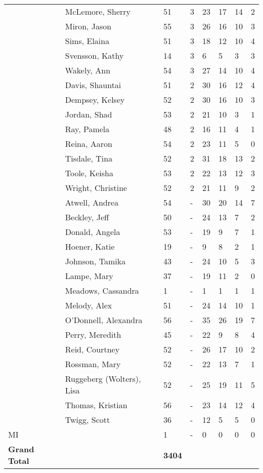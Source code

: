 \documentclass{article}\usepackage[]{graphicx}\usepackage[]{color}
\begin{document}
{\begin{longtable} { >{\raggedright}p{}p{}p{}p{}p{}p{}p{}p{}}
   \rowcolor[gray]{0.90} & McLemore, Sherry & 51 & 3 & 23 & 17 & 14 & 2 \\ 
   \rowcolor[gray]{0.90} & Miron, Jason & 55 & 3 & 26 & 16 & 10 & 3 \\ 
   & Sims, Elaina & 51 & 3 & 18 & 12 & 10 & 4 \\ 
   & Svensson, Kathy & 14 & 3 & 6 & 5 & 3 & 3 \\ 
   & Wakely, Ann & 54 & 3 & 27 & 14 & 10 & 4 \\ 
   \rowcolor[gray]{0.90} & Davis, Shauntai & 51 & 2 & 30 & 16 & 12 & 4 \\ 
   \rowcolor[gray]{0.90} & Dempsey, Kelsey & 52 & 2 & 30 & 16 & 10 & 3 \\ 
   \rowcolor[gray]{0.90} & Jordan, Shad & 53 & 2 & 21 & 10 & 3 & 1 \\ 
   & Ray, Pamela & 48 & 2 & 16 & 11 & 4 & 1 \\ 
   & Reina, Aaron & 54 & 2 & 23 & 11 & 5 & 0 \\ 
   & Tisdale, Tina & 52 & 2 & 31 & 18 & 13 & 2 \\ 
   \rowcolor[gray]{0.90} & Toole, Keisha & 53 & 2 & 22 & 13 & 12 & 3 \\ 
   \rowcolor[gray]{0.90} & Wright, Christine & 52 & 2 & 21 & 11 & 9 & 2 \\ 
   \rowcolor[gray]{0.90} & Atwell, Andrea & 54 & - & 30 & 20 & 14 & 7 \\ 
   & Beckley, Jeff & 50 & - & 24 & 13 & 7 & 2 \\ 
   & Donald, Angela & 53 & - & 19 & 9 & 7 & 1 \\ 
   & Hoener, Katie & 19 & - & 9 & 8 & 2 & 1 \\ 
   \rowcolor[gray]{0.90} & Johnson, Tamika & 43 & - & 24 & 10 & 5 & 3 \\ 
   \rowcolor[gray]{0.90} & Lampe, Mary & 37 & - & 19 & 11 & 2 & 0 \\ 
   \rowcolor[gray]{0.90} & Meadows, Cassandra & 1 & - & 1 & 1 & 1 & 1 \\ 
   & Melody, Alex & 51 & - & 24 & 14 & 10 & 1 \\ 
   & O'Donnell, Alexandra & 56 & - & 35 & 26 & 19 & 7 \\ 
   & Perry, Meredith & 45 & - & 22 & 9 & 8 & 4 \\ 
   \rowcolor[gray]{0.90} & Reid, Courtney & 52 & - & 26 & 17 & 10 & 2 \\ 
   \rowcolor[gray]{0.90} & Rossman, Mary & 52 & - & 22 & 13 & 7 & 1 \\ 
   \rowcolor[gray]{0.90} & Ruggeberg (Wolters), Lisa & 52 & - & 25 & 19 & 11 & 5 \\ 
   & Thomas, Kristian & 56 & - & 23 & 14 & 12 & 4 \\ 
   & Twigg, Scott & 36 & - & 12 & 5 & 5 & 0 \\ 
   \hline
MI &  & 1 & - & 0 & 0 & 0 & 0 \\ 
   \hline
\hline
\textbf{Grand Total} &  & \textbf{ 3404 } &  & {\textbf{1556} & {\textbf{879} & {\textbf{554} & {\textbf{161} \\ 
   \end{longtable}

}
\end{document}
